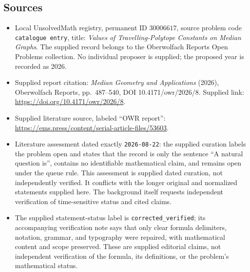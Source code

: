 \documentclass[11pt]{article}
\begin{document}
\subsection{Sources}
\begin{itemize}
\item Local UnsolvedMath registry, permanent ID \(30006617\), source problem code \texttt{catalogue entry}, title: \emph{Values of Travelling-Polytope Constants on Median Graphs}. The supplied record belongs to the Oberwolfach Reports Open Problems collection. No individual proposer is supplied; the proposed year is recorded as 2026.
\item Supplied report citation: \emph{Median Geometry and Applications} (2026), Oberwolfach Reports, pp.~487--540, DOI 10.4171/owr/2026/8. Supplied link: \url{https://doi.org/10.4171/owr/2026/8}.
\item Supplied literature source, labeled ``OWR report'': \url{https://ems.press/content/serial-article-files/53603}.
\item Literature assessment dated exactly \texttt{2026-08-22}: the supplied curation labels the problem open and states that the record is only the sentence ``A natural question is'', contains no identifiable mathematical claim, and remains open under the queue rule. This assessment is supplied dated curation, not independently verified. It conflicts with the longer original and normalized statements supplied here. The background itself requests independent verification of time-sensitive status and cited claims.
\item The supplied statement-status label is \texttt{corrected\_verified}; its accompanying verification note says that only clear formula delimiters, notation, grammar, and typography were repaired, with mathematical content and scope preserved. These are supplied editorial claims, not independent verification of the formula, its definitions, or the problem's mathematical status.
\end{itemize}
\end{document}
